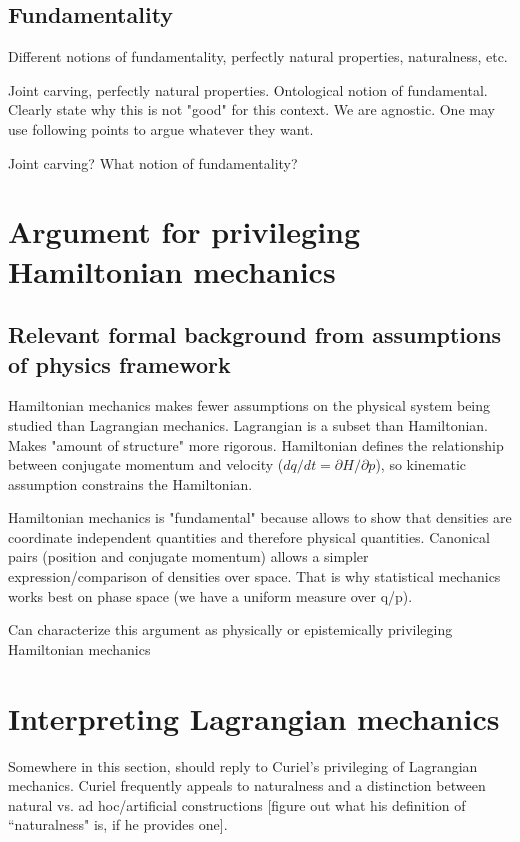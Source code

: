 \documentclass[letterpaper]{article}
\begin{document}
\subsection{Fundamentality}

Different notions of fundamentality, perfectly natural properties, naturalness, etc. 

Joint carving, perfectly natural properties. Ontological notion of fundamental. Clearly state why this is not "good" for this context. We are agnostic. One may use following points to argue whatever they want.

Joint carving? What notion of fundamentality? 

\section{Argument for privileging Hamiltonian mechanics}

\subsection{Relevant formal background from assumptions of physics framework}

Hamiltonian mechanics makes fewer assumptions on the physical system being studied than Lagrangian mechanics. Lagrangian is a subset than Hamiltonian. Makes "amount of structure" more rigorous. Hamiltonian defines the relationship between conjugate momentum and velocity ($dq/dt = \partial H / \partial p$), so kinematic assumption constrains the Hamiltonian.

Hamiltonian mechanics is "fundamental" because allows to show that densities are coordinate independent quantities and therefore physical quantities. Canonical pairs (position and conjugate momentum) allows a simpler expression/comparison of densities over space. That is why statistical mechanics works best on phase space (we have a uniform measure over q/p).

Can characterize this argument as physically or epistemically privileging Hamiltonian mechanics 

\section{Interpreting Lagrangian mechanics}

Somewhere in this section, should reply to Curiel's privileging of Lagrangian mechanics. Curiel frequently appeals to naturalness and a distinction between natural vs. ad hoc/artificial constructions [figure out what his definition of ``naturalness" is, if he provides one].
\end{document}
